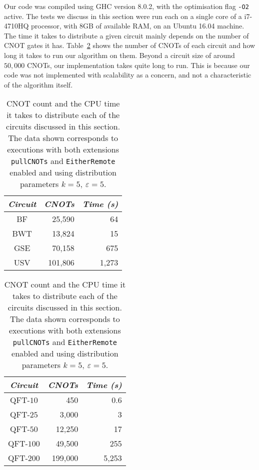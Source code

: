 Our code was compiled using GHC version 8.0.2, with the optimisation flag \texttt{-O2} active. The tests we discuss in this section were run each on a single core of a i7-4710HQ processor, with 8GB of available RAM, on an Ubuntu 16.04 machine. The time it takes to distribute a given circuit mainly depends on the number of CNOT gates it has. Table~\ref{tab:time} shows the number of CNOTs of each circuit and how long it takes to run our algorithm on them. Beyond a circuit size of around \(50,000\) CNOTs, our implementation takes quite long to run. This is because our code was not implemented with scalability as a concern, and not a characteristic of the algorithm itself.

\begin{table}
\caption{CNOT count and the CPU time it takes to distribute each of the circuits discussed in this section. The data shown corresponds to executions with both extensions \texttt{pullCNOTs} and \texttt{EitherRemote} enabled and using distribution parameters \(k\!=\!5,\ \varepsilon\!=\!5\).}
\label{tab:time}
\centering
\vspace*{3mm}
\begin{tabular}{|c|r|r|}
\hline
\textit{Circuit} & \textit{CNOTs} & \textit{Time (s)} \\
\hline
\small
{\small BF} & {\small 25,590} & {\small 64} \\
{\small BWT} & {\small 13,824} & {\small 15} \\
{\small GSE} & {\small 70,158} & {\small 675} \\
{\small USV} & {\small 101,806} & {\small 1,273}\\
\hline
\end{tabular}
\hspace{10mm}
\begin{tabular}{|c|r|r|}
\hline
\textit{Circuit} & \textit{CNOTs} & \textit{Time (s)} \\
\hline
{\small QFT-\(10\)} & {\small 450} & {\small 0.6} \\
{\small QFT-\(25\)} & {\small 3,000} & {\small 3} \\
{\small QFT-\(50\)} & {\small 12,250} & {\small 17} \\
{\small QFT-\(100\)} & {\small 49,500} & {\small 255} \\
{\small QFT-\(200\)} & {\small 199,000} & {\small 5,253} \\
\hline
\end{tabular}
\end{table}


